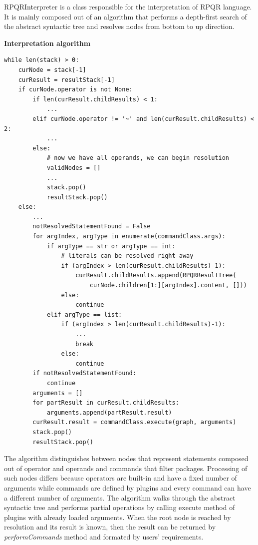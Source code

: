 RPQRInterpreter is a class responsible for the interpretation of RPQR language. It is mainly composed out
of an algorithm that performs a depth-first search of the abstract syntactic tree and resolves nodes from
bottom to up direction.

\textbf{Interpretation algorithm}

\begin{lstlisting}
while len(stack) > 0:
    curNode = stack[-1]
    curResult = resultStack[-1]
    if curNode.operator is not None:
        if len(curResult.childResults) < 1:
            ...
        elif curNode.operator != '~' and len(curResult.childResults) < 2:
            ...
        else:
            # now we have all operands, we can begin resolution
            validNodes = []
            ...
            stack.pop()
            resultStack.pop()
    else:
        ...
        notResolvedStatementFound = False
        for argIndex, argType in enumerate(commandClass.args):
            if argType == str or argType == int:
                # literals can be resolved right away
                if (argIndex > len(curResult.childResults)-1):
                    curResult.childResults.append(RPQRResultTree(
                        curNode.children[1:][argIndex].content, []))
                else:
                    continue
            elif argType == list:
                if (argIndex > len(curResult.childResults)-1):
                    ...
                    break
                else:
                    continue
        if notResolvedStatementFound:
            continue
        arguments = []
        for partResult in curResult.childResults:
            arguments.append(partResult.result)
        curResult.result = commandClass.execute(graph, arguments)
        stack.pop()
        resultStack.pop()
\end{lstlisting}

The algorithm distinguishes between nodes that represent statements composed out of operator and operands
and commands that filter packages. Processing of such nodes differs because operators are built-in
and have a fixed number of arguments while commands are defined by plugins and every command can have
a different number of arguments. The algorithm walks through the abstract syntactic tree and performs partial
operations by calling execute method of plugins with already loaded arguments. When the root node
is reached by resolution and its result is known, then the result can be returned by \textit{performCommands}
method and formated by users' requirements.


